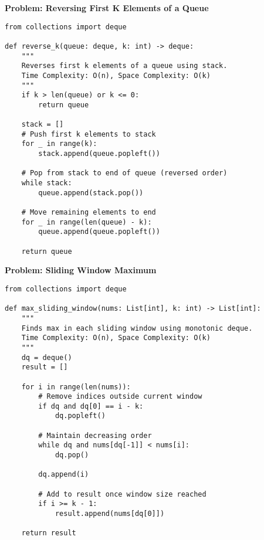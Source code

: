 \noindent\textbf{Problem: Reversing First K Elements of a Queue}
\begin{verbatim}
from collections import deque

def reverse_k(queue: deque, k: int) -> deque:
    """
    Reverses first k elements of a queue using stack.
    Time Complexity: O(n), Space Complexity: O(k)
    """
    if k > len(queue) or k <= 0:
        return queue
        
    stack = []
    # Push first k elements to stack
    for _ in range(k):
        stack.append(queue.popleft())
    
    # Pop from stack to end of queue (reversed order)
    while stack:
        queue.append(stack.pop())
    
    # Move remaining elements to end
    for _ in range(len(queue) - k):
        queue.append(queue.popleft())
        
    return queue
\end{verbatim}

\noindent\textbf{Problem: Sliding Window Maximum}
\begin{verbatim}
from collections import deque

def max_sliding_window(nums: List[int], k: int) -> List[int]:
    """
    Finds max in each sliding window using monotonic deque.
    Time Complexity: O(n), Space Complexity: O(k)
    """
    dq = deque()
    result = []
    
    for i in range(len(nums)):
        # Remove indices outside current window
        if dq and dq[0] == i - k:
            dq.popleft()
            
        # Maintain decreasing order
        while dq and nums[dq[-1]] < nums[i]:
            dq.pop()
            
        dq.append(i)
        
        # Add to result once window size reached
        if i >= k - 1:
            result.append(nums[dq[0]])
    
    return result
\end{verbatim}

